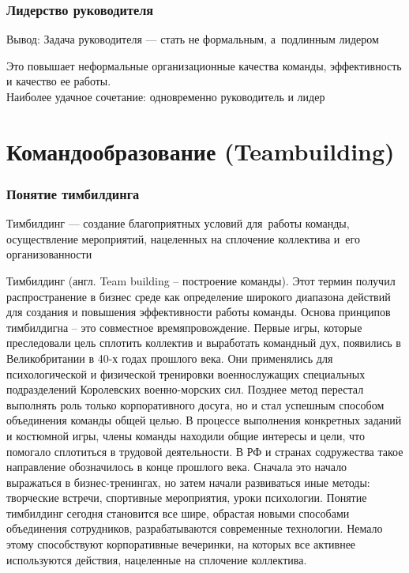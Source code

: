 \documentclass{../industrial-development}
\begin{document}
\begin{frame} \frametitle {Лидерство руководителя}

\begin{block}{Вывод:}
Задача руководителя --- стать не формальным, а~подлинным лидером \end{block}
Это повышает неформальные организационные качества команды, эффективность и качество ее работы.\\
\vspace{5pt} \alert{Наиболее удачное сочетание:} одновременно руководитель и лидер
\end{frame}




\section{Командообразование (Teambuilding)}

\begin{frame} \frametitle{Понятие тимбилдинга}
\begin{block}{}
Тимбилдинг --- создание благоприятных условий для~работы команды, осуществление мероприятий, нацеленных на сплочение коллектива и~его организованности
\end{block}
\end{frame}

\lecturenotes Тимбилдинг (англ. Team building – построение команды). Этот термин получил распространение в бизнес среде как определение широкого диапазона действий для создания и повышения эффективности работы команды. Основа принципов тимбилдигна – это совместное времяпровождение. 
Первые игры, которые преследовали цель сплотить коллектив и выработать командный дух, появились в Великобритании в 40-х годах прошлого века. Они применялись для психологической и физической тренировки военнослужащих специальных подразделений Королевских военно-морских сил. 
Позднее метод перестал выполнять роль только корпоративного досуга, но и стал успешным способом объединения команды общей целью. В процессе выполнения конкретных заданий и костюмной игры, члены команды находили общие интересы и цели, что помогало сплотиться в трудовой деятельности. В РФ и странах содружества такое направление обозначилось в конце прошлого века.
Сначала это начало выражаться в бизнес-тренингах, но затем начали развиваться иные методы: творческие встречи, спортивные мероприятия, уроки психологии. Понятие тимбилдинг сегодня становится все шире, обрастая новыми способами объединения сотрудников, разрабатываются современные технологии.
Немало этому способствуют корпоративные вечеринки, на которых все активнее используются действия, нацеленные на сплочение коллектива.
\end{document}
